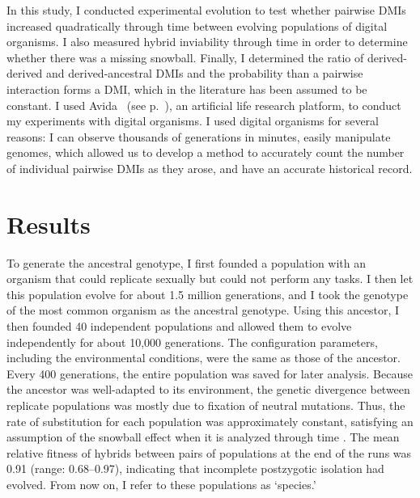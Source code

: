\begin{doublespace}


In this study, I conducted experimental evolution
to test whether pairwise DMIs increased quadratically through time
between evolving populations of digital organisms.
%
I also measured hybrid inviability through time
in order to determine whether there was a missing snowball.
%
Finally, I determined the ratio of derived-derived and derived-ancestral DMIs
and the probability than a pairwise interaction forms a DMI,
which in the literature has been assumed to be constant.
%
I used Avida~\citep{ofr04} (see p.~\pageref{sec:avida}),
an artificial life research platform,
to conduct my experiments with digital organisms.
%
I used digital organisms for several reasons:
I can observe thousands of generations in minutes,
easily manipulate genomes, which allowed us to
develop a method to accurately count the number of individual pairwise DMIs
as they arose,
and have an accurate historical record.







\section{Results}

To generate the ancestral genotype, I first founded a population
with an organism that could replicate sexually but could not perform any tasks.
%
I then let this population evolve for about 1.5 million generations,
and I took the genotype of the most common organism as the ancestral genotype.
%
Using this ancestor, I then founded 40 independent populations
and allowed them to evolve independently for about 10,000 generations.
%
The configuration parameters, including the environmental conditions,
were the same as those of the ancestor.
%
Every 400 generations, the entire population was saved for later analysis.
%
Because the ancestor was well-adapted to its environment,
the genetic divergence between replicate populations
was mostly due to fixation of neutral mutations.
%
Thus, the rate of substitution for each population
was approximately constant,
satisfying an assumption of the snowball effect
when it is analyzed through time \citep{orr95}.
%
The mean relative fitness of hybrids between pairs of populations
at the end of the runs was 0.91 (range: 0.68--0.97),
indicating that incomplete postzygotic isolation had evolved.
%
From now on, I refer to these populations as `species.'




\end{doublespace}
